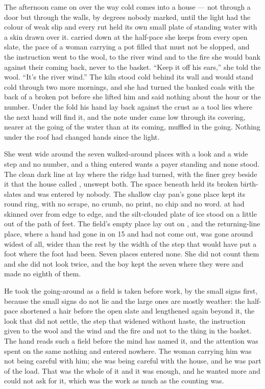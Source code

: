 The afternoon came on over  the way cold comes into a house --- not through a door but through the walls, by degrees nobody marked, until the light had the colour of weak slip and every rut held its own small plate of standing water with a skin drawn over it.  carried  down at the half-pace she keeps from every open slate, the pace of a woman carrying a pot filled that must not be slopped, and the instruction went to the wool, to the river wind and to the fire she would bank against their coming back, never to the basket. “Keep it off his ears,” she told the wool. “It's the river wind.” The kiln stood cold behind its wall and would stand cold through two more mornings, and she had turned the banked coals with the back of a broken pot before she lifted him and said nothing about the hour or the number. Under the fold his hand lay back against the crust as a tool lies where the next hand will find it, and the note under  came low through its covering, nearer at the going of the water than at its coming, muffled in the going. Nothing under the roof had changed hands since the light.

She went wide around the seven walked-around places with a look and a wide step and no number, and a thing entered wants a payer standing and none stood. The clean dark line at  lay where the ridge had turned, with the finer grey beside it that the house called , unswept both. The space beneath  held its broken birth-slates and was entered by nobody. The shallow clay pan's gone place kept its round ring, with no scrape, no crumb, no print, no chip and no word.  at  had skinned over from edge to edge, and the silt-clouded plate of ice stood on  a little out of the path of feet. The field's empty place lay out on , and the returning-line place, where a hand had gone in on  15 and had not come out, was gone around widest of all, wider than the rest by the width of the step that would have put a foot where the foot had been. Seven places entered none. She did not count them and she did not look twice, and the boy kept the seven where they were and made no eighth of them.

He took the going-around as a field is taken before work, by the small signs first, because the small signs do not lie and the large ones are mostly weather: the half-pace shortened a hair before the open slate and lengthened again beyond it, the look that did not settle, the step that widened without haste, the instruction given to the wool and the wind and the fire and not to the thing in the basket. The hand reads such a field before the mind has named it, and the attention was spent on the same nothing and entered nowhere. The woman carrying him was not being careful with him; she was being careful with the house, and he was part of the load. That was the whole of it and it was enough, and he wanted more and could not ask for it, which was the work as much as the counting was.

